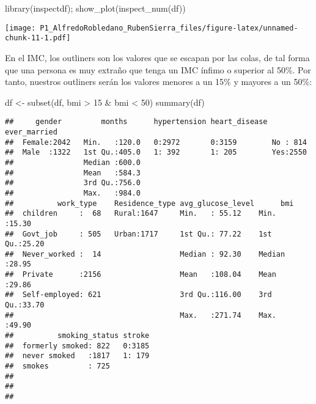 \documentclass[
]{article}
\newenvironment{Shaded}{\begin{snugshade}}{\end{snugshade}}
\newcommand{\DecValTok}[1]{\textcolor[rgb]{0.00,0.00,0.81}{#1}}
\newcommand{\FunctionTok}[1]{\textcolor[rgb]{0.00,0.00,0.00}{#1}}
\newcommand{\NormalTok}[1]{#1}
\newcommand{\OtherTok}[1]{\textcolor[rgb]{0.56,0.35,0.01}{#1}}
\newcommand{\SpecialCharTok}[1]{\textcolor[rgb]{0.00,0.00,0.00}{#1}}
\begin{document}
\begin{Shaded}
\begin{Highlighting}[]
\FunctionTok{library}\NormalTok{(inspectdf);}
\FunctionTok{show\_plot}\NormalTok{(}\FunctionTok{inspect\_num}\NormalTok{(df))}
\end{Highlighting}
\end{Shaded}

\texttt{[image: P1\_AlfredoRobledano\_RubenSierra\_files/figure-latex/unnamed-chunk-11-1.pdf]}

En el IMC, los outliners son los valores que se escapan por las colas,
de tal forma que una persona es muy extraño que tenga un IMC ínfimo o
superior al 50\%. Por tanto, nuestros outliners serán los valores
menores a un 15\% y mayores a un 50\%:

\begin{Shaded}
\begin{Highlighting}[]
\NormalTok{df }\OtherTok{\textless{}{-}} \FunctionTok{subset}\NormalTok{(df, bmi }\SpecialCharTok{\textgreater{}} \DecValTok{15} \SpecialCharTok{\&}\NormalTok{ bmi }\SpecialCharTok{\textless{}} \DecValTok{50}\NormalTok{)}
\FunctionTok{summary}\NormalTok{(df)}
\end{Highlighting}
\end{Shaded}

\begin{verbatim}
##     gender         months      hypertension heart_disease ever_married
##  Female:2042   Min.   :120.0   0:2972       0:3159        No : 814    
##  Male  :1322   1st Qu.:405.0   1: 392       1: 205        Yes:2550    
##                Median :600.0                                          
##                Mean   :584.3                                          
##                3rd Qu.:756.0                                          
##                Max.   :984.0                                          
##          work_type    Residence_type avg_glucose_level      bmi       
##  children     :  68   Rural:1647     Min.   : 55.12    Min.   :15.30  
##  Govt_job     : 505   Urban:1717     1st Qu.: 77.22    1st Qu.:25.20  
##  Never_worked :  14                  Median : 92.30    Median :28.95  
##  Private      :2156                  Mean   :108.04    Mean   :29.86  
##  Self-employed: 621                  3rd Qu.:116.00    3rd Qu.:33.70  
##                                      Max.   :271.74    Max.   :49.90  
##          smoking_status stroke  
##  formerly smoked: 822   0:3185  
##  never smoked   :1817   1: 179  
##  smokes         : 725           
##                                 
##                                 
## 
\end{verbatim}
\end{document}

